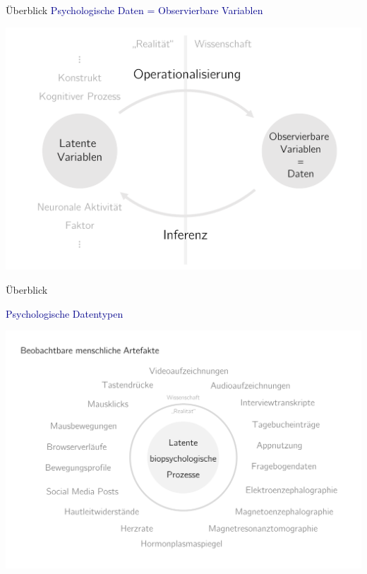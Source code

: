 \documentclass[
  8pt,
  ignorenonframetext,
]{beamer}
\begin{document}
\begin{frame}{Überblick}
\protect\hypertarget{uxfcberblick-6}{}
\textcolor{darkblue}{Psychologische Daten = Observierbare Variablen}
\vspace{1mm}

\begin{center}\includegraphics[width=0.85\linewidth]{3_Abbildungen/pfm_3_latente_variablen} \end{center}
\end{frame}

\begin{frame}{Überblick}
\protect\hypertarget{uxfcberblick-7}{}
\vspace{2mm}

\textcolor{darkblue}{Psychologische Datentypen} \vspace{-2mm}

\begin{center}\includegraphics[width=1\linewidth]{3_Abbildungen/pfm_3_psychologische_daten} \end{center}
\end{frame}
\end{document}
